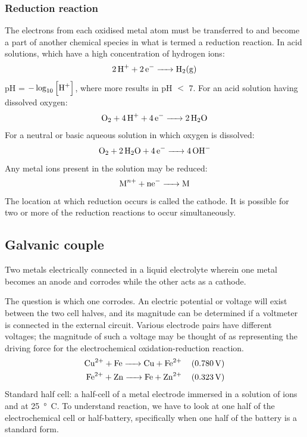 \subsubsection{Reduction reaction}
The electrons from each oxidised metal atom must be transferred to and become a part of another chemical species in what is termed a reduction reaction. In acid solutions, which have a high concentration of hydrogen ions:
\begin{equation}
    \ce{2H^+ + 2e^- -> H2(g)}
\end{equation}
pH = $- \log_{10}\left[\ce{H^+}\right]$, where more  results in pH $<$ 7. For an acid solution having dissolved oxygen:
\begin{equation}
    \ce{O2 + 4H^+ + 4e^- -> 2H2O}
\end{equation}
For a neutral or basic aqueous solution in which oxygen is dissolved:
\begin{equation}
    \ce{O2 + 2H2O + 4e^- -> 4OH^-}
\end{equation}
Any metal ions present in the solution may be reduced:
\begin{gather}
    \ce{M^n+ + ne^- -> M}
\end{gather}
The location at which reduction occurs is called the cathode. It is possible for two or more of the reduction reactions to occur simultaneously.
\subsection{Galvanic couple}
Two metals electrically connected in a liquid electrolyte wherein one metal becomes an anode and corrodes while the other acts as a cathode.

The question is which one corrodes. An electric potential or voltage will exist between the two cell halves, and its magnitude can be determined if a voltmeter is connected in the external circuit. Various electrode pairs have different voltages; the magnitude of such a voltage may be thought of as representing the driving force for the electrochemical oxidation-reduction reaction.
\begin{align}
    \ce{Cu^2+ + Fe -> Cu + Fe^2+} \quad & \left(\SI{0.780}{\volt}\right) \\
    \ce{Fe^2+ + Zn -> Fe + Zn^2+} \quad & \left(\SI{0.323}{\volt}\right)
\end{align}
Standard half cell: a half-cell of a metal electrode immersed in a  solution of ions and at \SI{25}{\degree C}. To understand reaction, we have to look at one half of the electrochemical cell or half-battery, specifically when one half of the battery is a standard form.
